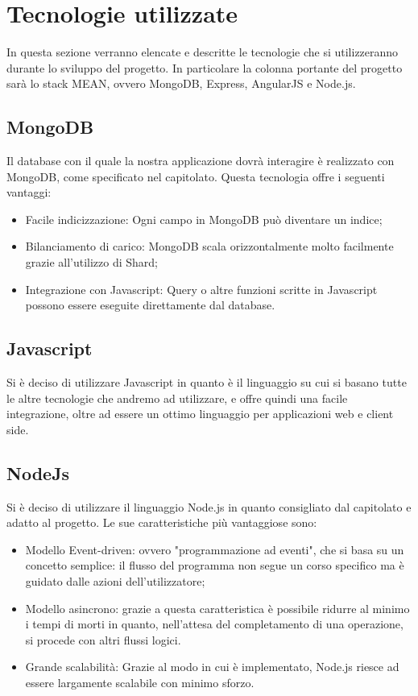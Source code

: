 \newpage
\section{Tecnologie utilizzate}
In questa sezione verranno elencate e descritte le tecnologie che si utilizzeranno durante lo sviluppo del progetto. In particolare la colonna portante del progetto sarà lo stack MEAN, ovvero MongoDB, Express, AngularJS e Node.js.

\subsection{MongoDB}
Il database con il quale la nostra applicazione dovrà interagire è realizzato con MongoDB, come specificato nel capitolato. Questa tecnologia offre i seguenti vantaggi:
\begin{itemize}
\item Facile indicizzazione: Ogni campo in MongoDB può diventare un indice;
\item Bilanciamento di carico: MongoDB scala orizzontalmente molto facilmente grazie all'utilizzo di Shard;
\item Integrazione con Javascript: Query o altre funzioni scritte in Javascript possono essere eseguite direttamente dal database.
\end{itemize}

\subsection{Javascript}
Si è deciso di utilizzare Javascript in quanto è il linguaggio su cui si basano tutte le altre tecnologie che andremo ad utilizzare, e offre quindi una facile integrazione, oltre ad essere un ottimo linguaggio per applicazioni web e client side.

\subsection{NodeJs}
Si è deciso di utilizzare il linguaggio Node.js in quanto consigliato dal capitolato e adatto al progetto. Le sue caratteristiche più vantaggiose sono:
\begin{itemize}
\item Modello Event-driven: ovvero "programmazione ad eventi", che si basa su un concetto semplice: il flusso del programma non segue un corso specifico ma è guidato dalle azioni dell'utilizzatore;
\item Modello asincrono: grazie a questa caratteristica è possibile ridurre al minimo i tempi di morti in quanto, nell'attesa del completamento di una operazione, si procede con altri flussi logici. 
\item Grande scalabilità: Grazie al modo in cui è implementato, Node.js riesce ad essere largamente scalabile con minimo sforzo.
\end{itemize}

